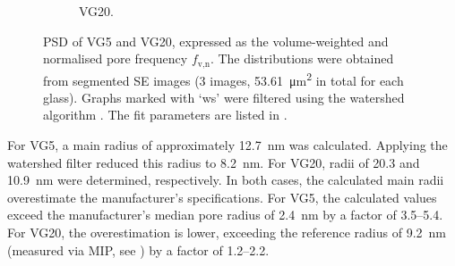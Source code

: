 \begin{figure}[htbp]
\begin{subfigure}{0.49\textwidth}
        \caption{\acs{VG20}.}
        \label{fig:compare_psd_20nm}
    \end{subfigure}
	\caption{
		\acs*{PSD} of \acs{VG5} and \acs{VG20}, expressed as the volume-weighted and normalised pore frequency $f_\text{v,n}$.
		The distributions were obtained from segmented \ac{SE} images (\num{3} images, \qty{53.61}{\micro\meter\squared} in total for each glass).
		Graphs marked with `ws' were filtered using the watershed algorithm \cite{beucher.1992}.
		The fit parameters are listed in .
	}
    \label{fig:compare_psd_vycor}
\end{figure}


For \acs{VG5}, a main radius of approximately \qty{12.7}{\nano\meter} was calculated.
Applying the watershed filter reduced this radius to \qty{8.2}{\nano\meter}.
For \acs{VG20}, radii of \num{20.3} and \qty{10.9}{\nano\meter} were determined, respectively.
In both cases, the calculated main radii overestimate the manufacturer's specifications.
For \acs{VG5}, the calculated values exceed the manufacturer's median pore radius of \qty{2.4}{\nano\meter} by a factor of \numrange{3.5}{5.4}.
For \acs{VG20}, the overestimation is lower, exceeding the reference radius of \qty{9.2}{\nano\meter} (measured via \ac{MIP}, see ) by a factor of \numrange{1.2}{2.2}.

